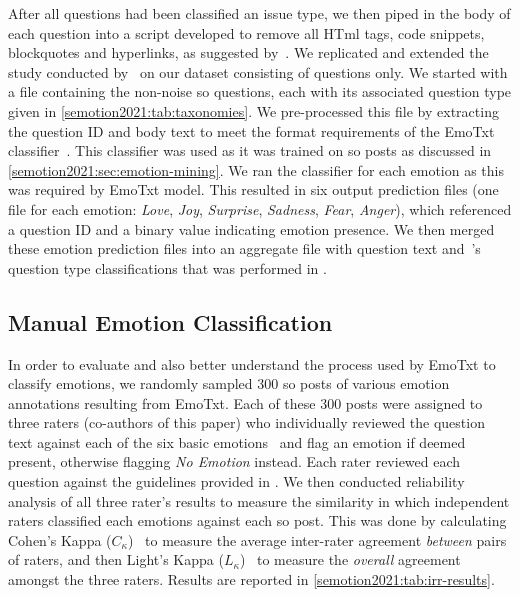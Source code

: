 After all questions had been classified an issue type, we then piped in the body of each question into a script developed to remove all HT\gls{ml} tags, code snippets, blockquotes and hyperlinks, as suggested by~\citet{novielli2018}. We replicated and extended the study conducted by~\citet{novielli2018} on our dataset consisting of questions only.
We started with a file containing the \SEMNumTotalNonNoisePosts{} non-noise \gls{so} questions, each with its associated question type given in \cref{semotion2021:tab:taxonomies}. We pre-processed this file by extracting the question ID and body text to meet the format requirements of the EmoTxt classifier~\citep{calefato2017}. This classifier was used as it was trained on \gls{so} posts as discussed in \cref{semotion2021:sec:emotion-mining}. We ran the classifier for each emotion as this was required by EmoTxt model. This resulted in six output prediction files (one file for each emotion: \textit{Love}, \textit{Joy}, \textit{Surprise}, \textit{Sadness}, \textit{Fear}, \textit{Anger}), which referenced a question ID and a binary value indicating emotion presence. We then merged these emotion prediction files into an aggregate file with question text and~\citeauthor{Beyer:2018fm}'s question type classifications that was performed in \citep{Cummaudo:2020icse}.

\subsection{Manual Emotion Classification} 
\label{semotion2021:ssec:manual}
\def\cohen{$C_{\kappa}$}
\def\light{$L_{\kappa}$}

In order to evaluate and also better understand the process used by EmoTxt to classify emotions, we randomly sampled 300 \gls{so} posts of various emotion annotations resulting from EmoTxt. Each of these 300 posts were assigned to three raters (co-authors of this paper) who individually reviewed the question text against each of the six basic emotions~\citep{shaver1987} and flag an emotion if deemed present, otherwise flagging \textit{No Emotion} instead. Each rater reviewed each question against the guidelines provided in \citep{novielli2018}. We then conducted reliability analysis of all three rater's results to measure the similarity in which independent raters classified each emotions against each \gls{so} post. This was done by calculating Cohen's Kappa (\cohen{})~\citep{Cohen:1960tf} to measure the average inter-rater agreement \textit{between} pairs of raters, and then Light's Kappa (\light{})~\citep{Light:1971vz} to measure the \textit{overall} agreement amongst the three raters. Results are reported in \cref{semotion2021:tab:irr-results}.

